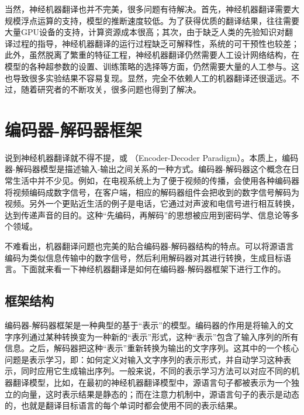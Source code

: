 \parinterval  当然，神经机器翻译也并不完美，很多问题有待解决。首先，神经机器翻译需要大规模浮点运算的支持，模型的推断速度较低。为了获得优质的翻译结果，往往需要大量GPU设备的支持，计算资源成本很高；其次，由于缺乏人类的先验知识对翻译过程的指导，神经机器翻译的运行过程缺乏可解释性，系统的可干预性也较差；此外，虽然脱离了繁重的特征工程，神经机器翻译仍然需要人工设计网络结构，在模型的各种超参数的设置、训练策略的选择等方面，仍然需要大量的人工参与。这也导致很多实验结果不容易复现。显然，完全不依赖人工的机器翻译还很遥远。不过，随着研究者的不断攻关，很多问题也得到了解决。

\sectionnewpage
\section{编码器-解码器框架}

\parinterval 说到神经机器翻译就不得不提{\small{}}，或{\small{}} （Encoder-Decoder Paradigm）。本质上，编码器-解码器模型是描述输入-输出之间关系的一种方式。编码器-解码器这个概念在日常生活中并不少见。例如，在电视系统上为了便于视频的传播，会使用各种编码器将视频编码成数字信号，在客户端，相应的解码器组件会把收到的数字信号解码为视频。另外一个更贴近生活的例子是电话，它通过对声波和电信号进行相互转换，达到传递声音的目的。这种“先编码，再解码”的思想被应用到密码学、信息论等多个领域。

\parinterval 不难看出，机器翻译问题也完美的贴合编码器-解码器结构的特点。可以将源语言编码为类似信息传输中的数字信号，然后利用解码器对其进行转换，生成目标语言。下面就来看一下神经机器翻译是如何在编码器-解码器框架下进行工作的。

\subsection{框架结构}

\parinterval  编码器-解码器框架是一种典型的基于“表示”的模型。编码器的作用是将输入的文字序列通过某种转换变为一种新的“表示”形式，这种“表示”包含了输入序列的所有信息。之后，解码器把这种“表示”重新转换为输出的文字序列。这其中的一个核心问题是表示学习，即：如何定义对输入文字序列的表示形式，并自动学习这种表示，同时应用它生成输出序列。一般来说，不同的表示学习方法可以对应不同的机器翻译模型，比如，在最初的神经机器翻译模型中，源语言句子都被表示为一个独立的向量，这时表示结果是静态的；而在注意力机制中，源语言句子的表示是动态的，也就是翻译目标语言的每个单词时都会使用不同的表示结果。

